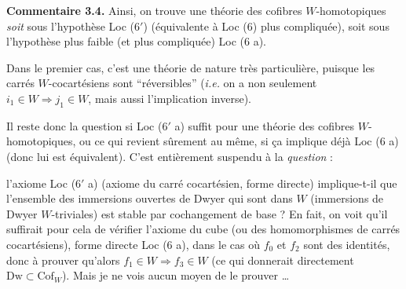 \documentclass[11pt]{article}
\newcommand{\printedpage}[1]{\marginpar{\footnotesize p.~#1}}
\newcommand{\msp}[1]{\marginpar{\footnotesize [#1]}}
\newcommand{\Cof}{\mathrm{Cof}}
\begin{document}
\textbf{Commentaire 3.4.} Ainsi, on trouve une théorie des cofibres $W$-homotopiques \textit{soit} sous l'hypothèse Loc (6$'$) (équivalente à Loc (6) plus compliquée), soit sous l'hypothèse plus faible (et plus compliquée) Loc (6 a).

Dans le premier cas, c'est une théorie de nature très particulière, puisque les carrés $W$-cocartésiens sont “réversibles” (\textit{i.e.} on a non seulement $i_1 \in W \Longrightarrow j_1 \in W$, mais aussi l'implication inverse).

Il reste donc la question si Loc (6$'$ a) suffit pour une théorie des cofibres $W$-homotopiques, ou ce qui revient sûrement au même, si ça implique déjà Loc (6 a) (donc lui est équivalent). C'est entièrement suspendu à la \textit{question} :

\printedpage{16}
\msp{page 23}%
l'axiome Loc (6$'$ a) (axiome du carré cocartésien, forme directe) implique-t-il que l'ensemble des immersions ouvertes de Dwyer qui sont dans $W$ (immersions de Dwyer $W$-triviales) est stable par cochangement de base ? En fait, on voit qu'il suffirait pour cela de vérifier l'axiome du cube (ou des homomorphismes de carrés cocartésiens), forme directe Loc (6 a), dans le cas où $f_0$ et $f_2$ sont des identités, donc à prouver qu'alors $f_1 \in W \Longrightarrow f_3 \in W$ (ce qui donnerait directement $\mathrm{Dw} \subset \Cof_W$). Mais je ne vois aucun moyen de le prouver \dots
\end{document}
